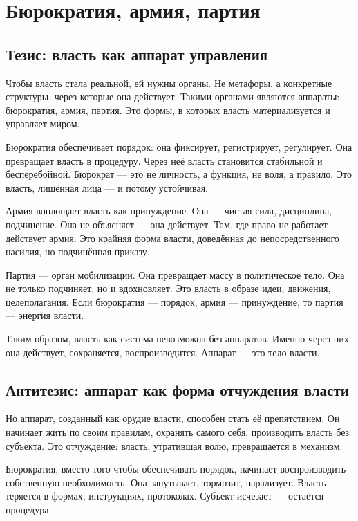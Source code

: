 \chapter{Бюрократия, армия, партия}

\section{Тезис: власть как аппарат управления}

Чтобы власть стала реальной, ей нужны органы. Не метафоры, а конкретные структуры, через которые она действует. Такими органами являются аппараты: бюрократия, армия, партия. Это формы, в которых власть материализуется и управляет миром.

Бюрократия обеспечивает порядок: она фиксирует, регистрирует, регулирует. Она превращает власть в процедуру. Через неё власть становится стабильной и бесперебойной. Бюрократ — это не личность, а функция, не воля, а правило. Это власть, лишённая лица — и потому устойчивая.

Армия воплощает власть как принуждение. Она — чистая сила, дисциплина, подчинение. Она не объясняет — она действует. Там, где право не работает — действует армия. Это крайняя форма власти, доведённая до непосредственного насилия, но подчинённая приказу.

Партия — орган мобилизации. Она превращает массу в политическое тело. Она не только подчиняет, но и вдохновляет. Это власть в образе идеи, движения, целеполагания. Если бюрократия — порядок, армия — принуждение, то партия — энергия власти.

Таким образом, власть как система невозможна без аппаратов. Именно через них она действует, сохраняется, воспроизводится. Аппарат — это тело власти.

\section{Антитезис: аппарат как форма отчуждения власти}

Но аппарат, созданный как орудие власти, способен стать её препятствием. Он начинает жить по своим правилам, охранять самого себя, производить власть без субъекта. Это отчуждение: власть, утратившая волю, превращается в механизм.

Бюрократия, вместо того чтобы обеспечивать порядок, начинает воспроизводить собственную необходимость. Она запутывает, тормозит, парализует. Власть теряется в формах, инструкциях, протоколах. Субъект исчезает — остаётся процедура.

